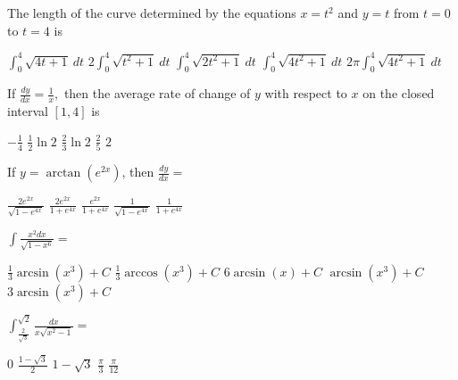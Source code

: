 \begin{questions}
\question[2] The length of the curve determined by the equations $x =
    t^2$ and $y = t$ from $t = 0$ to $t = 4$ is

    \begin{oneparchoices}
    \choice $\int_0^4 \sqrt{4t + 1}\ dt$
    \choice $2\int_0^4\sqrt{t^2 + 1}\ dt$
    \choice $\int_0^4\sqrt{2t^2 + 1}\ dt$
    \CorrectChoice $\int_0^4\sqrt{4t^2 + 1}\ dt$
    \choice $2\pi\int_0^4\sqrt{4t^2 + 1}\ dt$
    \end{oneparchoices}

\question[2] If $\frac{dy}{dx} = \frac{1}{x},$ then the average rate
    of change of $y$ with respect to $x$ on the closed interval $[1,
    4]$ is

    \begin{oneparchoices}
    \choice $-\frac{1}{4}$
    \choice $\frac{1}{2}\ln 2$
    \CorrectChoice $\frac{2}{3}\ln 2$
    \choice $\frac{2}{5}$
    \choice $2$
    \end{oneparchoices}

\question[2] If $y = \arctan(e^{2x})$, then $\frac{dy}{dx} =$

    \begin{oneparchoices}
    \choice $\frac{2e^{2x}}{\sqrt{1 - e^{4x}}}$
    \CorrectChoice $\frac{2e^{2x}}{1 + e^{4x}}$
    \choice $\frac{e^{2x}}{1 + e^{4x}}$
    \choice $\frac{1}{\sqrt{1 - e^{4x}}}$
    \choice $\frac{1}{1 + e^{4x}}$
    \end{oneparchoices}

\question[2] $\int \frac{x^2 dx}{\sqrt{1 - x^6}} = $

    \begin{oneparchoices}
    \CorrectChoice $\frac{1}{3}\arcsin(x^3) + C$
    \choice $\frac{1}{3}\arccos(x^3) + C$ 
    \choice $6\arcsin(x) + C$
    \choice $\arcsin(x^3) + C$
    \choice $3\arcsin(x^3) + C$
    \end{oneparchoices}

\question[2]
    $\int_{\frac{2}{\sqrt{3}}}^{\sqrt{2}} \frac{dx}{x\sqrt{x^2 - 1}} = $

    \begin{oneparchoices}
    \choice $0$
    \choice $\frac{1 - \sqrt{3}}{2}$
    \choice $1 - \sqrt{3}$
    \choice $\frac{\pi}{3}$
    \CorrectChoice $\frac{\pi}{12}$
    \end{oneparchoices}


\end{questions}

